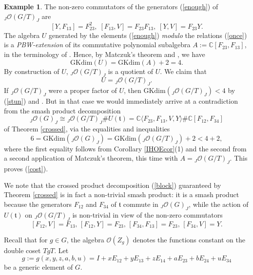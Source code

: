 \documentclass{amsart}
\numberwithin{equation}{section}
\theoremstyle{definition}
\newtheorem{example}[theorem]{Example}
\begin{document}
\begin{example}
The non-zero commutators of the generators (\ref{enough}) of ${}_J\mathcal{O}(G/T)_J$ are 
\begin{equation}\label{once} 
[Y,F_{13}] = F_{23}^2, \; [F_{13},V] = F_{23}F_{13}, \; [Y,V] =F_{23}Y.
\end{equation}
The algebra $U$ generated by the elements (\ref{enough}) \emph{modulo} the relations (\ref{once}) is a \emph{PBW-extension} of its commutative polynomial subalgebra $A := \mathbb{C}[F_{23},F_{13}]$, in the terminology of \cite[Definition, page 163]{KL}. Hence, by Matczuk's theorem \cite[Theorem A]{Mat} and \cite[Theorem 12.3.1]{KL}, we have
\begin{equation}\label{stun} \mathrm{GKdim}(U)= \mathrm{GKdim}(A) + 2  = 4.
\end{equation}
\noindent By construction of $U$, ${}_J\mathcal{O}(G/T)_J$ is a quotient of $U$. We claim that
\begin{equation}\label{cost} U = {}_J\mathcal{O}(G/T)_J.
\end{equation} 
If ${}_J\mathcal{O}(G/T)_J$ were a proper factor of $U$, then $\mathrm{GKdim}({}_J\mathcal{O}(G/T)_J) < 4$ by (\ref{stun}) and \cite[Proposition 3.15]{KL}. But in that case we would immediately arrive at a contradiction  from the smash product decomposition 
\begin{equation}\label{block} {}_J\mathcal{O}(G)_J \cong {}_J\mathcal{O}(G/T)_J \# U(\mathfrak{t}) = \mathbb{C}\langle F_{23},F_{13}, V,Y\rangle \# \mathbb{C}[F_{12}, F_{34}]
\end{equation}
of Theorem \ref{crossed}, via the equalities and inequalities 
$$ 6 = \mathrm{GKdim}({}_J\mathcal{O}(G)_J) =\mathrm{GKdim}({}_J\mathcal{O}(G/T)_J) + 2 <  4 + 2,$$
where the first equality follows from Corollary \ref{IHOEcor}(1) and the second from a second application of Matczuk's theorem, this time with $A = {}_J\mathcal{O}(G/T)_J$. This proves (\ref{cost}).

We note that the crossed product decomposition (\ref{block}) guaranteed by Theorem \ref{crossed} is in fact a non-trivial smash product: it is a smash product because the generators $F_{12}$ and $F_{34}$ of $\mathfrak{t}$ commute in ${}_J\mathcal{O}(G)_J$, while the action of $U(\mathfrak{t})$ on ${}_J\mathcal{O}(G/T)_J$ is non-trivial in view of the non-zero commutators
$$ [F_{12},V] = F_{13}, \, [F_{12}, Y] = F_{23}, \, [F_{34}, F_{13}] = F_{23},\, [F_{34},V] = Y.$$
\medskip

 Recall that for $g \in G$, the algebra $\mathcal{O}(Z_g)$ denotes the functions constant on the double coset $TgT$. Let
\begin{equation}\label{choice} 
g := g(x,y,z,a,b,u) = I + xE_{12} + yE_{13} + zE_{14} + aE_{23} + bE_{24} + uE_{34} 
\end{equation}
be a generic element of $G$.
\medskip


\end{example}
\end{document}
